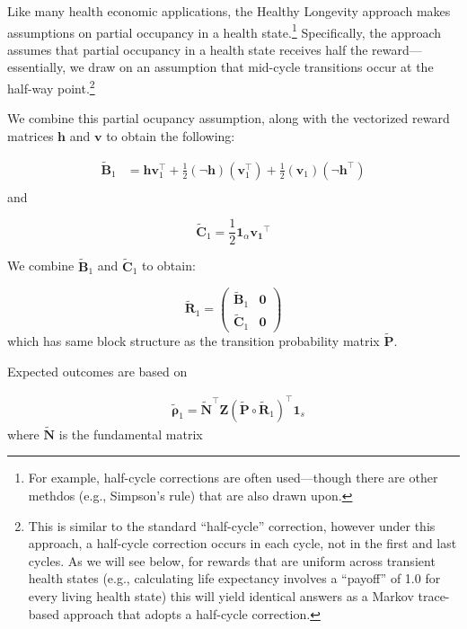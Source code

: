 \documentclass[
]{agujournal2019}
\begin{document}
Like many health economic applications, the Healthy Longevity approach
makes assumptions on partial occupancy in a health state.\footnote{For
  example, half-cycle corrections are often used---though there are
  other methdos (e.g., Simpson's rule) that are also drawn upon.}
Specifically, the approach assumes that partial occupancy in a health
state receives half the reward---essentially, we draw on an assumption
that mid-cycle transitions occur at the half-way point.\footnote{This is
  similar to the standard ``half-cycle'' correction, however under this
  approach, a half-cycle correction occurs in each cycle, not in the
  first and last cycles. As we will see below, for rewards that are
  uniform across transient health states (e.g., calculating life
  expectancy involves a ``payoff'' of 1.0 for every living health state)
  this will yield identical answers as a Markov trace-based approach
  that adopts a half-cycle correction.}

We combine this partial ocupancy assumption, along with the vectorized
reward matrices \(\mathbf{h}\) and \(\mathbf{v}\) to obtain the
following:

\[
\begin{aligned}
\tilde{\mathbf{B}}_{1} & =\mathbf{h} \mathbf{v}_{1}^{\top}+\frac{1}{2}(\neg \mathbf{h})\left(\mathbf{v}_{1}^{\top}\right)+\frac{1}{2}\left(\mathbf{v}_{1}\right)\left(\neg \mathbf{h}^{\top}\right) \\
\end{aligned}
\] and

\[
\tilde{\mathbf{C}}_{1}=\frac{1}{2} \mathbf{1}_{\alpha} \mathbf{v_1}^{\top}
\]

We combine \(\tilde{\mathbf{B}}_{1}\) and \(\tilde{\mathbf{C}}_{1}\) to
obtain:

\[
\tilde{\mathbf{R}}_{1}=\left(\begin{array}{c|c}
\tilde{\mathbf{B}}_{1} & \mathbf{0} \\
\hline \tilde{\mathbf{C}}_{1} & \mathbf{0}
\end{array}\right) 
\] which has same block structure as the transition probability matrix
\(\tilde{\mathbf{P}}\).

Expected outcomes are based on

\[
\begin{aligned}
& \tilde{\boldsymbol{\rho}}_{1}=\tilde{\mathbf{N}}^{\top} \mathbf{Z}\left(\tilde{\mathbf{P}} \circ \tilde{\mathbf{R}}_{1}\right)^{\top} \mathbf{1}_{s} 
\end{aligned}
\] where \(\tilde{\mathbf{N}}\) is the fundamental matrix
\end{document}
